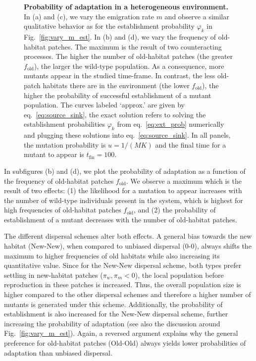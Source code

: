 \documentclass[a4paper,11pt]{article}
\newcommand{\chg}[1]{\textcolor{change}{#1}}
\begin{document}
\begin{figure}[t!]
	\caption{\textbf{Probability of adaptation in a heterogeneous environment.} \small In (a) and (c), we vary the emigration rate $m$ and observe a similar qualitative behavior as for the establishment probability $\varphi_k$ in Fig.~\ref{fig:vary_m_est}. In (b) and (d), we vary the frequency of old-habitat patches. The maximum is the result of two counteracting processes. The higher the number of old-habitat patches (the greater $f_{\text{old}}$), the larger the wild-type population. As a consequence, more mutants appear in the studied time-frame. In contrast, the less old-patch habitats there are in the environment (the lower $f_{\text{old}}$), the higher the probability of successful establishment of a mutant population. The curves labeled `approx.' are given by eq.~\eqref{eq:source_sink}, the exact solution refers to solving the establishment probabilities $\varphi_k$ from eq.~\eqref{eq:ext_prob} numerically and plugging these solutions into eq.~\eqref{eq:source_sink}. In all panels, the mutation probability is $u=1/(M K)$ and the final time for a mutant to appear is $t_{\text{fin}}=100$. }
	\label{fig:source_sink}
\end{figure}

In subfigures (b) and (d), we plot the probability of adaptation as a function of the frequency of old-habitat patches $f_{\text{old}}$. We observe a maximum which is the result of two effects: (1) the likelihood for a mutation to appear increases with the number of wild-type individuals present in the system, which is highest for high frequencies of old-habitat patches $f_{\text{old}}$, and (2) the probability of establishment of a mutant decreases with the number of old-habitat patches. 

The different dispersal schemes alter both effects. \chg{A general bias towards the new habitat (New-New)}, when compared to \chg{unbiased} dispersal (0-0), always shifts the maximum to higher frequencies of old habitats while also increasing its quantitative value. \chg{Since for the New-New dispersal scheme, both types prefer settling in new-habitat patches ($\pi_w,\pi_m<0$), the local population before reproduction in these patches is increased. Thus, the overall population size is higher compared to the other dispersal schemes and therefore a higher number of mutants is generated under this scheme.} Additionally, the probability of establishment is also increased for \chg{the New-New} dispersal scheme, further increasing the probability of adaptation (see also the discussion around Fig.~\ref{fig:vary_m_est}). Again, a reversed argument explains why \chg{the general preference for old-habitat patches (Old-Old)} always yields lower probabilities of adaptation than \chg{unbiased} dispersal.  
\end{document}
